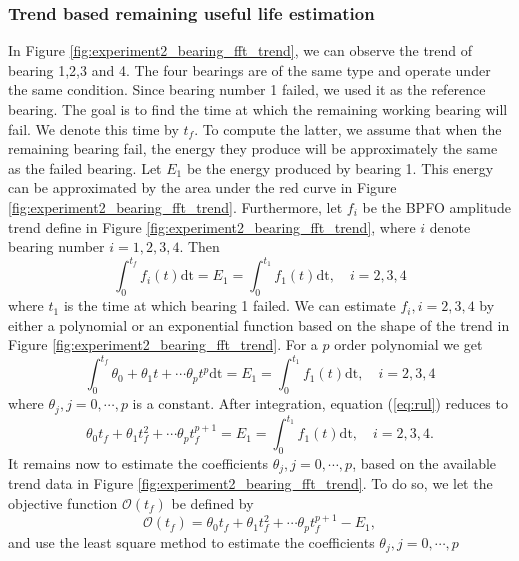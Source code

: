 \documentclass[../Main/thesis.tex]{subfiles}
\begin{document}
\subsubsection{Trend based remaining useful life estimation}
In Figure  \ref{fig:experiment2_bearing_fft_trend}, we can observe the trend of bearing 1,2,3 and 4. The four bearings are of the same type and operate under the same condition. Since bearing number 1 failed, we used it as the reference bearing. The goal is to find the time at which the remaining working bearing will fail. We denote this time by $t_{f}$. To compute the latter, we assume that when the remaining bearing fail, the energy they produce will be approximately the same as the failed bearing. Let $E_{1}$ be the energy produced by bearing 1. This energy can be approximated by the area under the red curve in Figure \ref{fig:experiment2_bearing_fft_trend}. Furthermore, let $f_{i}$ be the BPFO amplitude trend define in Figure  \ref{fig:experiment2_bearing_fft_trend}, where $i$ denote bearing number $i= 1,2,3,4$. Then
\begin{equation}
\int_{0}^{t_{f}} f_{i}(t)\mathrm{dt}=E_{1} = \int_{0}^{t_{1}} f_{1}(t)\mathrm{dt}, \quad i = 2,3,4
\end{equation}
where $t_{1}$ is the time at which bearing 1 failed. We can estimate $f_{i}, i = 2,3,4$ by either a polynomial or an exponential function based on the shape of the trend in Figure \ref{fig:experiment2_bearing_fft_trend}.
For a $p$ order polynomial we get
\begin{equation}\label{eq:rul}
\int_{0}^{t_{f}} \theta_{0}+\theta_{1}t+\cdots \theta_{p}t^{p} \mathrm{dt}=E_{1} = \int_{0}^{t_{1}} f_{1}(t)\mathrm{dt}, \quad i = 2,3,4
\end{equation}
where $\theta_{j}, j = 0,\cdots,p$ is a constant. After integration, equation (\ref{eq:rul}) reduces to 
\begin{equation}\label{eq:rul1}
\theta_{0}t_{f}+\theta_{1}t_{f}^{2}+\cdots \theta_{p}t_{f}^{p+1} =E_{1} = \int_{0}^{t_{1}} f_{1}(t)\mathrm{dt}, \quad i = 2,3,4.
\end{equation}
It remains now to estimate the coefficients $\theta_{j}, j = 0,\cdots,p$, based on the available trend data in Figure \ref{fig:experiment2_bearing_fft_trend}. To do so, we let the objective function $\mathcal{O}(t_{f})$ be defined by 
\begin{equation}
\mathcal{O}(t_{f}) = \theta_{0}t_{f}+\theta_{1}t_{f}^{2}+\cdots \theta_{p}t_{f}^{p+1}-E_{1},
\end{equation}
and use the least square method to estimate the coefficients $\theta_{j}, j = 0,\cdots,p$
\end{document}
